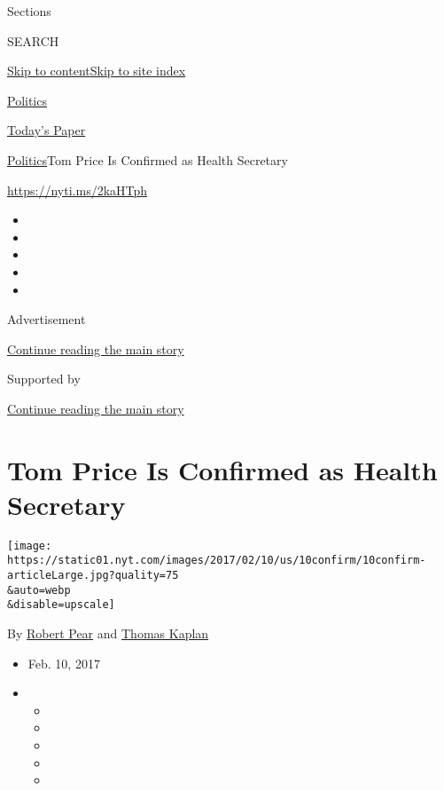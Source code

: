 Sections

SEARCH

\protect\hyperlink{site-content}{Skip to
content}\protect\hyperlink{site-index}{Skip to site index}

\href{https://www.nytimes.com/section/politics}{Politics}

\href{https://myaccount.nytimes.com/auth/login?response_type=cookie\&client_id=vi}{}

\href{https://www.nytimes.com/section/todayspaper}{Today's Paper}

\href{/section/politics}{Politics}\textbar{}Tom Price Is Confirmed as
Health Secretary

\url{https://nyti.ms/2kaHTph}

\begin{itemize}
\item
\item
\item
\item
\item
\end{itemize}

Advertisement

\protect\hyperlink{after-top}{Continue reading the main story}

Supported by

\protect\hyperlink{after-sponsor}{Continue reading the main story}

\hypertarget{tom-price-is-confirmed-as-health-secretary}{%
\section{Tom Price Is Confirmed as Health
Secretary}\label{tom-price-is-confirmed-as-health-secretary}}

\texttt{[image: https://static01.nyt.com/images/2017/02/10/us/10confirm/10confirm-articleLarge.jpg?quality=75\\\&auto=webp\\\&disable=upscale]}

By \href{https://www.nytimes.com/by/robert-pear}{Robert Pear} and
\href{http://www.nytimes.com/by/thomas-kaplan}{Thomas Kaplan}

\begin{itemize}
\item
  Feb. 10, 2017
\item
  \begin{itemize}
  \item
  \item
  \item
  \item
  \item
  \end{itemize}
\end{itemize}

